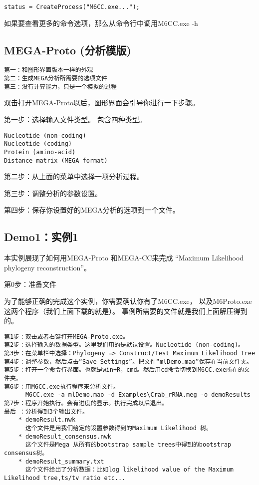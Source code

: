 \documentclass[11pt]{ctexart}
\begin{document}
\begin{verbatim}
status = CreateProcess("M6CC.exe...");
\end{verbatim}
如果要查看更多的命令选项，那么从命令行中调用M6CC.exe -h
\subsection{MEGA-Proto (分析模版)}
\label{sec-3-5}


\begin{verbatim}
第一：和图形界面版本一样的外观
第二：生成MEGA分析所需要的选项文件
第三：没有计算能力，只是一个模拟的过程
\end{verbatim}
双击打开MEGA-Proto以后，图形界面会引导你进行一下步骤。

第一步：选择输入文件类型。
包含四种类型。

\begin{verbatim}
Nucleotide (non-coding)
Nucleotide (coding)
Protein (amino-acid)
Distance matrix (MEGA format)
\end{verbatim}

第二步：从上面的菜单中选择一项分析过程。

第三步：调整分析的参数设置。

第四步：保存你设置好的MEGA分析的选项到一个文件。
\subsection{Demo1：实例1}
\label{sec-3-6}

本实例展现了如何用MEGA-Proto 和MEGA-CC来完成
“Maximum Likelihood phylogeny reconstruction”。

第0步：准备文件

为了能够正确的完成这个实例，你需要确认你有了M6CC.exe，
以及M6Proto.exe这两个程序（我们上面下载的就是）。
事例所需要的文件就是我们上面解压得到的。

\begin{verbatim}
第1步：双击或者右键打开MEGA-Proto.exe。
第2步：选择输入的数据类型。这里我们用的是默认设置。Nucleotide (non-coding)。
第3步：在菜单栏中选择：Phylogeny => Construct/Test Maximum Likelihood Tree
第4步：调整参数，然后点击“Save Settings”。把文件“mlDemo.mao”保存在当前文件夹。
第5步：打开一个命令行界面。也就是win+R，cmd。然后用cd命令切换到M6CC.exe所在的文件夹。
第6步：用M6CC.exe执行程序来分析文件。
      M6CC.exe -a mlDemo.mao -d Examples\Crab_rRNA.meg -o demoResults
第7步：程序开始执行。会有进度的显示。执行完成以后退出。
最后 ：分析得到3个输出文件。
    * demoResult.nwk
      这个文件是用我们给定的设置参数得到的Maximum Likelihood 树。
    * demoResult_consensus.nwk
      这个文件是Mega 从所有的bootstrap sample trees中得到的bootstrap consensus树。
    * demoResult_summary.txt
      这个文件给出了分析数据：比如log likelihood value of the Maximum Likelihood tree,ts/tv ratio etc...
\end{verbatim}
\end{document}
